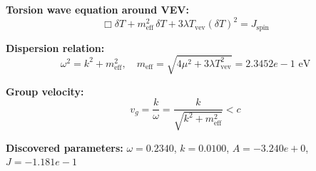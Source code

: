 
\textbf{Torsion wave equation around VEV:}
\begin{equation}
  \Box \delta T + m_{\text{eff}}^2 \, \delta T + 3\lambda T_{\text{vev}} (\delta T)^2 = J_{\text{spin}}
\end{equation}

\textbf{Dispersion relation:}
\begin{equation}
  \omega^2 = k^2 + m_{\text{eff}}^2, \quad
  m_{\text{eff}} = \sqrt{4\mu^2 + 3\lambda T_{\text{vev}}^2} = 2.3452e-1 \text{ eV}
\end{equation}

\textbf{Group velocity:}
\begin{equation}
  v_g = \frac{k}{\omega} = \frac{k}{\sqrt{k^2 + m_{\text{eff}}^2}} < c
\end{equation}

\textbf{Discovered parameters:}
$\omega = 0.2340$, \quad
$k = 0.0100$, \quad
$A = -3.240e+0$, \quad
$J = -1.181e-1$